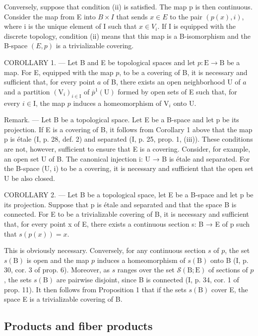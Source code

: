Conversely, suppose that condition (ii) is satisfied. The map p is then continuous. Consider the map from E into \(B \times I\) that sends \(x \in E\) to the pair \((p(x), i)\), where i is the unique element of I such that \(x \in V_i\). If I is equipped with the discrete topology, condition (ii) means that this map is a B-isomorphism and the B-space \((E, p)\) is a trivializable covering.

COROLLARY 1. --- Let B and E be topological spaces and let \(p\colon \mathrm{E}\to \mathrm{B}\) be a map. For E, equipped with the map \(p\), to be a covering of B, it is necessary and sufficient that, for every point \(a\) of B, there exists an open neighborhood U of \(a\) and a partition \((\mathrm{V}_i)_{i\in \mathrm{I}}\) of \(\overline{p}^{1}(\mathrm{U})\) formed by open sets of E such that, for every \(i\in \mathrm{I}\), the map \(p\) induces a homeomorphism of \(\mathrm{V}_i\) onto U.

Remark. --- Let B be a topological space. Let E be a B-space and let p be its projection. If E is a covering of B, it follows from Corollary 1 above that the map p is étale (I, p. 28, def. 2) and separated (I, p. 25, prop. 1, (iii)). These conditions are not, however, sufficient to ensure that E is a covering. Consider, for example, an open set U of B. The canonical injection i: U → B is étale and separated. For the B-space (U, i) to be a covering, it is necessary and sufficient that the open set U be also closed.

COROLLARY 2. --- Let B be a topological space, let E be a B-space and let p be its projection. Suppose that p is étale and separated and that the space B is connected. For E to be a trivializable covering of B, it is necessary and sufficient that, for every point x of E, there exists a continuous section s: B → E of p such that \(s(p(x)) = x\).

This is obviously necessary. Conversely, for any continuous section \(s\) of \(p\), the set \(s(\mathrm{B})\) is open and the map \(p\) induces a homeomorphism of \(s(\mathrm{B})\) onto B (I, p. 30, cor. 3 of prop. 6). Moreover, as \(s\) ranges over the set \(\mathcal{S}(\mathrm{B};\mathrm{E})\) of sections of \(p\), the sets \(s(\mathrm{B})\) are pairwise disjoint, since B is connected (I, p. 34, cor. 1 of prop. 11). It then follows from Proposition 1 that if the sets \(s(\mathrm{B})\) cover E, the space E is a trivializable covering of B.

\subsection{Products and fiber products}

